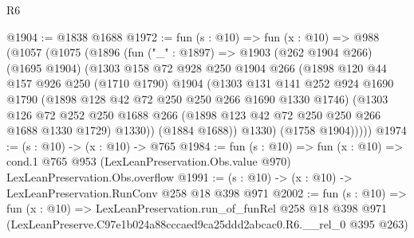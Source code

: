 \begin{lexlean}{R6}
\begin{coremodule}
@1904 := @1838 @1688
@1972 := fun (s : @10) =>
  fun (x : @10) =>
  @988
    (@1057
      (@1075
        (@1896
          (fun ("_" : @1897) =>
          @1903
            (@262 @1904 @266)
            (@1695 @1904)
            (@1303
              @158
              @72
              @928
              @250
              @1904
              @266
              (@1898
                @120
                @44
                @157
                @926
                @250
                (@1710 @1790)
                @1904
                (@1303
                  @131
                  @141
                  @252
                  @924
                  @1690
                  @1790
                  (@1898 @128 @42 @72 @250 @250 @266 @1690 @1330 @1746)
                  (@1303
                    @126
                    @72
                    @252
                    @250
                    @1688
                    @266
                    (@1898 @123 @42 @72 @250 @250 @266 @1688 @1330 @1729)
                    @1330))
                (@1884 @1688))
              @1330)
            (@1758 @1904)))))
@1974 := (s : @10) -> (x : @10) -> @765
@1984 := fun (s : @10) =>
  fun (x : @10) =>
  cond.{1} @765 @953 (LexLeanPreservation.Obs.value @970) LexLeanPreservation.Obs.overflow
@1991 := (s : @10) -> (x : @10) -> LexLeanPreservation.RunConv @258 @18 @398 @971
@2002 := fun (s : @10) =>
  fun (x : @10) =>
  LexLeanPreservation.run_of_funRel
    @258
    @18
    @398
    @971
    (LexLeanPreserve.C97e1b024a88cccaed9ca25ddd2abcac0.R6.__rel_0 @395 @263)
\end{coremodule}
\end{lexlean}
